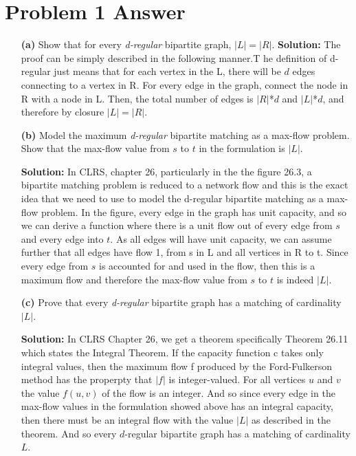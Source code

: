 \documentclass[letterpaper, 11pt]{article}
\begin{document}
\section*{Problem 1 Answer}
\begin{itemize}
\item[\textbf{(a)}] Show that for every \textit{d-regular} bipartite graph, $|L|=|R|$.
\newline \newline \textbf{Solution:} The proof can be simply described in the following manner.T he definition of d-regular just means that for each vertex in the L, there will be $d$ edges connecting to a vertex in R. For every edge in the graph, connect the node in R with a node in L. Then, the total number of edges is $|R|$*$d$ and $|L|$*$d$, and therefore by closure $|L| = |R|$.

\item[\textbf{(b)}] Model the maximum \textit{d-regular} bipartite matching as a max-flow problem. Show that the max-flow value from $s$ to $t$ in the formulation is $|L|$.

\newline \newline \textbf{Solution:} In CLRS, chapter 26, particularly in the the figure 26.3, a bipartite matching problem is reduced to a network flow and this is the exact idea that we need to use to model the d-regular bipartite matching as a max-flow problem. In the figure, every edge in the graph has unit capacity, and so we can derive a function where there is a unit flow out of every edge from $s$ and every edge into $t$. As all edges will have unit capacity, we can assume further that all edges have flow 1, from s in L and all vertices in R to t. Since every edge from $s$ is accounted for and used in the flow, then this is a maximum flow and therefore the max-flow value from $s$ to $t$ is indeed $|L|$.

\item[\textbf{(c)}] Prove that every \textit{d-regular} bipartite graph has a matching of cardinality $|L|$.

\newline \newline \textbf{Solution:} In CLRS Chapter 26, we get a theorem specifically Theorem 26.11 which states the Integral Theorem. If the capacity function c takes only integral values, then the maximum flow f produced by the Ford-Fulkerson method has the properpty that $|f|$ is integer-valued. For all vertices $u$ and $v$ the value $f(u,v)$ of the flow is an integer. And so since every edge in the max-flow values in the formulation showed above has an integral capacity, then there must be an integral flow with the value $|L|$ as described in the theorem. And so every $d$-regular bipartite graph has a matching of cardinality $L$.


\end{itemize}
\end{document}
